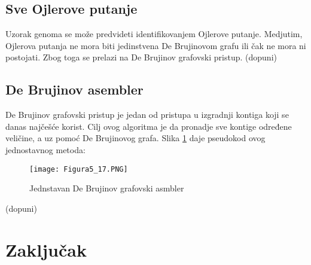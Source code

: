 \documentclass[12pt,oneside]{memoir}
\begin{document}
\begin{comment}
Na slici \ref{fig:5}(c) se može videti primer koji ilustruje izvršavanje algoritma DSK. Neka je $n_{list} = 2$, $n_{sublist} = 2$ and $h(z) = b(z)$ za svaki $z \in Z$. Kako je $n_{list} = 2$, algoritam izvršava 2 iteracije (u nastavku sledi opis nulte iteracije, jer se prva izvršava slično). Prva faza nulte iteracije skenira sve k-mere iz $Z$ i identifikuje svaki k-mer $z \in Z$ koji pripada nultoj listi. Na primer, $h(GG) = 10$, kako je $h(GG)$ \textit{mod} $n_{list} = 0$ i $\frac{h(z)}{n_{list}}$ \textit{mod} $n_{sublist} = 1$, $GG$ pripada nultoj listi i prvoj podlisti. Nakon toga, nulta lista se deli na nultu podlistu $\{CA\}$ i prvu podlistu $\{CG, GG\}$. Obe podliste su zapisane na disku. Druga faza čita svaku podlistu iz memorije i broji k-mere koristeći $JellyFish$ algoritam.
\end{comment}

\section{Sve Ojlerove putanje}

Uzorak genoma se može predvideti identifikovanjem Ojlerove putanje. Medjutim, Ojlerova putanja ne mora biti jedinstvena De Brujinovom grafu ili čak ne mora ni postojati. Zbog toga se prelazi na De Brujinov grafovski pristup. (dopuni)

\section{De Brujinov asembler}

De Brujinov grafovski pristup je jedan od pristupa u izgradnji kontiga koji se danas najčešće korist. Cilj ovog algoritma je da pronadje sve kontige određene veličine, a uz pomoć De Brujinovog grafa. Slika \ref{fig:11} daje pseudokod ovog jednostavnog metoda:

\begin{figure}[!ht]
\centering
\texttt{[image: Figura5\_17.PNG]}
\caption{Jednstavan De Brujinov grafovski asmbler}
\label{fig:11}
\end{figure}

(dopuni)



\chapter{Zaključak}
\end{document}
